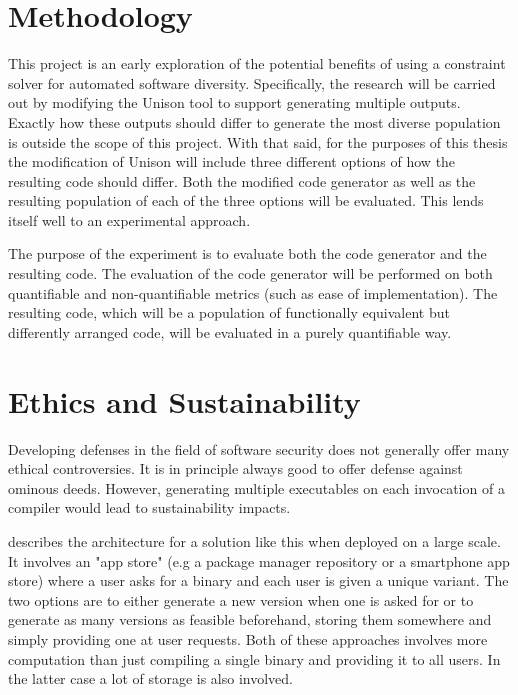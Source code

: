 \section{Methodology}

This project is an early exploration of the potential benefits of using a constraint solver
for automated software diversity. Specifically, the research will be carried out by
modifying the Unison tool to support generating multiple outputs. Exactly how these
outputs should differ to generate the most diverse population is outside the scope of this
project. With that said, for the purposes of this thesis the modification of Unison will
include three different options of how the resulting code should differ. Both the modified
code generator as well as the resulting population of each of the three options will be
evaluated. This lends itself well to an experimental approach.

The purpose of the experiment is to evaluate both the code generator and the resulting
code. The evaluation of the code generator will be performed on both quantifiable and
non-quantifiable metrics (such as ease of implementation). The resulting code, which will
be a population of functionally equivalent but differently arranged code, will be evaluated
in a purely quantifiable way.

\section{Ethics and Sustainability}

Developing defenses in the field of software security does not generally offer many
ethical controversies. It is in principle always good to offer defense against ominous
deeds. However, generating multiple executables on each invocation of a compiler would
lead to sustainability impacts.

\textcite{compiler-generated-sw-div} describes the architecture for a solution like this
when deployed on a large scale. It involves an "app store" (e.g a package manager
repository or a smartphone app store) where a user asks for a binary and each user is given
a unique variant. The two options are to either generate a new version when one is asked
for or to generate as many versions as feasible beforehand, storing them somewhere and
simply providing one at user requests. Both of these approaches involves more computation
than just compiling a single binary and providing it to all users. In the latter case a
lot of storage is also involved.

